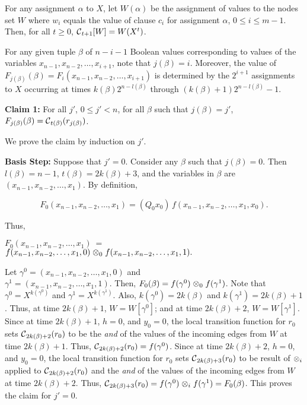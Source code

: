 For any assignment $\alpha$ to $X$, 
let $W(\alpha)$ be the assignment of values to the nodes set $W$ 
where $w_i$ equals the value of clause $c_i$ for assignment $\alpha$, $ 0 \leq i \leq m-1$.
Then,  for all $t \geq 0$, $\mbox{$\mathcal{C}$}_{t+1}[W] = W(X^t)$.

For any given tuple $\beta$ of  $n-i-1$ Boolean values 
corresponding to values of the variables $x_{n-1}, x_{n-2}, \ldots , x_{i+1}$,
note that $j(\beta) = i$.
Moreover, the value of $F_{j(\beta)}(\beta) = F_i(x_{n-1}, x_{n-2}, \ldots , x_{i+1})$
is determined by the $2^{i+1}$ assignments to $X$  occurring at times 
$k(\beta) 2^{n-l(\beta)}$ through $(k(\beta)+1) 2^{n-l(\beta)}-1$.

\smallskip
\noindent
{\bf Claim 1:} For all $j'$, $0 \leq j' < n$,
for all $\beta$ such that $j(\beta) = j'$,
$F_{j(\beta)}(\beta) =\mbox{$\mathcal{C}$}_{t(\beta)}(r_{j(\beta)})$.

\smallskip

\noindent
We prove the claim by induction on $j'$.

\smallskip
\noindent
{\bf Basis Step:} Suppose that $j' = 0$.
Consider any $\beta$ such that $j(\beta) = 0$.
Then $l(\beta) = n-1$, $t(\beta) = 2k(\beta) + 3$,
and the variables in $\beta$ are $(x_{n-1}, x_{n-2}, \ldots , x_1)$.
By definition,

\smallskip

$$F_0(x_{n-1}, x_{n-2}, \ldots, x_1) 
= (Q_0 x_0) \, f(x_{n-1}, x_{n-2}, \ldots , x_1, x_0).$$

\smallskip

\noindent
Thus,\\ \smallskip

$F_0(x_{n-1}, x_{n-2}, \ldots , x_1) ~=~$ \\
\hspace*{0.1in}
$f(x_{n-1}, x_{n-2}, \ldots , x_1, 0) \; \mbox{$\otimes$}_0 \; 
f(x_{n-1}, x_{n-2}, \ldots , x_1, 1).$ \\

\smallskip

\noindent
Let $\gamma^0 = (x_{n-1}, x_{n-2}, \ldots , x_1, 0)$ and\\
$\gamma^1 = (x_{n-1}, x_{n-2}, \ldots , x_1, 1)$.
Then, $F_0(\beta) =  
f(\gamma^0) \; \mbox{$\otimes$}_0 \; f(\gamma^1)$.
Note that $\gamma^0 = X^{k(\gamma^0)}$ and $\gamma^1 = X^{k(\gamma^1)}$.
Also, $k(\gamma^0) = 2k(\beta)$ and $k(\gamma^1) = 2k(\beta)+1$.
Thus, at time $2k(\beta)+1$, $W = W[\gamma^0]$;
and at time $2k(\beta)+2$, $W = W[\gamma^1]$.
Since at time $2k(\beta)+1$, $h=0$, and $y_0 = 0$, 
the local transition function for $r_0$ sets $\mbox{$\mathcal{C}$}_{2k(\beta)+2}(r_0)$ to be 
the {\em and} of the values of the incoming edges from $W$ at time $2k(\beta)+1$.
Thus, $\mbox{$\mathcal{C}$}_{2k(\beta)+2}(r_0) = f(\gamma^0)$.
Since at time $2k(\beta)+2$, $h=0$, and $y_0 = 0$, 
the local transition function for $r_0$ sets $\mbox{$\mathcal{C}$}_{2k(\beta)+3}(r_0)$ 
to be result of $\mbox{$\otimes$}_i$
applied to $\mbox{$\mathcal{C}$}_{2k(\beta)+2}(r_0)$ and
the {\em and} of the values of the incoming edges from $W$ at time $2k(\beta)+2$.
Thus, $\mbox{$\mathcal{C}$}_{2k(\beta)+3}(r_0) = f(\gamma^0) \; \mbox{$\otimes$}_i \; f(\gamma^1) = F_0(\beta)$.
This proves the claim for $j' = 0$.

